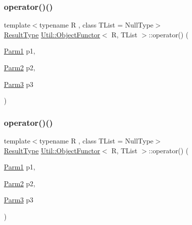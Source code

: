 \mbox{\label{classUtil_1_1ObjectFunctor_a6dea319b30584bd1bb9f6bf4b8d36e11}} 
\subsubsection{\texorpdfstring{operator()()}{operator()()}\hspace{0.1cm}{\footnotesize\ttfamily [10/18]}}
{\footnotesize\ttfamily template$<$typename R , class T\+List  = Null\+Type$>$ \\
\mbox{\hyperlink{classUtil_1_1ObjectFunctor_a77f816e98108848347d0dfc085090a1c}{Result\+Type}} \mbox{\hyperlink{classUtil_1_1ObjectFunctor}{Util\+::\+Object\+Functor}}$<$ R, T\+List $>$\+::operator() (\begin{DoxyParamCaption}\item[{\mbox{\hyperlink{classUtil_1_1ObjectFunctor_a199715d28029627c2ae7219c13b04d26}{Parm1}}}]{p1,  }\item[{\mbox{\hyperlink{classUtil_1_1ObjectFunctor_a6809cf65883dc7575e01d9b9849649cf}{Parm2}}}]{p2,  }\item[{\mbox{\hyperlink{classUtil_1_1ObjectFunctor_a6becd26610c6091b9ba93cd96f3def66}{Parm3}}}]{p3 }\end{DoxyParamCaption})\hspace{0.3cm}{\ttfamily [inline]}}

\mbox{\label{classUtil_1_1ObjectFunctor_a6dea319b30584bd1bb9f6bf4b8d36e11}} 
\subsubsection{\texorpdfstring{operator()()}{operator()()}\hspace{0.1cm}{\footnotesize\ttfamily [11/18]}}
{\footnotesize\ttfamily template$<$typename R , class T\+List  = Null\+Type$>$ \\
\mbox{\hyperlink{classUtil_1_1ObjectFunctor_a77f816e98108848347d0dfc085090a1c}{Result\+Type}} \mbox{\hyperlink{classUtil_1_1ObjectFunctor}{Util\+::\+Object\+Functor}}$<$ R, T\+List $>$\+::operator() (\begin{DoxyParamCaption}\item[{\mbox{\hyperlink{classUtil_1_1ObjectFunctor_a199715d28029627c2ae7219c13b04d26}{Parm1}}}]{p1,  }\item[{\mbox{\hyperlink{classUtil_1_1ObjectFunctor_a6809cf65883dc7575e01d9b9849649cf}{Parm2}}}]{p2,  }\item[{\mbox{\hyperlink{classUtil_1_1ObjectFunctor_a6becd26610c6091b9ba93cd96f3def66}{Parm3}}}]{p3 }\end{DoxyParamCaption})\hspace{0.3cm}{\ttfamily [inline]}}

